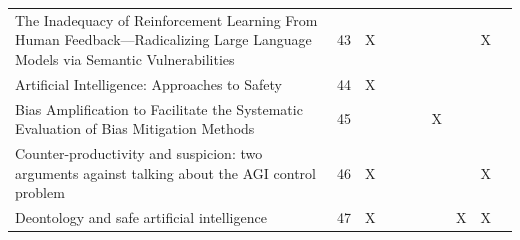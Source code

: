 \begin{landscape}
\begin{longtable}{|p{14cm}|c|c|c|c|c|c|c|c|c|}
		The Inadequacy of Reinforcement Learning From Human Feedback---Radicalizing Large Language Models via Semantic Vulnerabilities                          & 43          & X                                  &                                                           &                                                       &                                                            &                                           &                                              & X                                                  &                                    \\
		Artificial Intelligence: Approaches to Safety                                                                                                           & 44          & X                                  &                                                           &                                                       &                                                            &                                           &                                              &                                                    &                                    \\
		Bias Amplification to Facilitate the Systematic Evaluation of Bias Mitigation Methods                                                                   & 45          &                                    &                                                           &                                                       &                                                            & X                                         &                                              &                                                    &                                    \\
		Counter-productivity and suspicion: two arguments against talking about the AGI control problem                                                         & 46          & X                                  &                                                           &                                                       &                                                            &                                           &                                              & X                                                  &                                    \\
		Deontology and safe artificial intelligence                                                                                                             & 47          & X                                  &                                                           &                                                       &                                                            &                                           & X                                            & X                                                  &                                    \\

\end{longtable}
\end{landscape}
